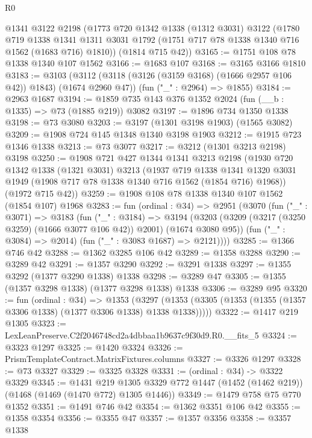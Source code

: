 \begin{lexlean}{R0}
\begin{coremodule}
    @1341
    @3122
    @2198
    (@1773
      @720
      @1342
      @1338
      (@1312 @3031)
      @3122
      (@1780
        @719
        @1338
        @1341
        @1311
        @3031
        @1792
        (@1751 @717 @78 @1338 @1340 @716 @1562 (@1683 @716) @1810))
      (@1814 @715 @42))
@3165 := @1751 @108 @78 @1338 @1340 @107 @1562
@3166 := @1683 @107
@3168 := @3165 @3166 @1810
@3183 := @3103
    (@3112 (@3118 (@3126 (@3159 @3168) (@1666 @2957 @106 @42)) @1843) (@1674 @2960 @47))
    (fun ("_" : @2964) => @1855)
@3184 := @2963 @1687
@3194 := @1859 @735 @143 @376 @1352 @2024 (fun (__b : @1335) => @73 (@1885 @219)) @3082
@3197 := @1896 @734 @1350 @1338
@3198 := @73 @3080
@3203 := @3197 (@1301 @3198 @1903) (@1565 @3082)
@3209 := @1908 @724 @145 @1348 @1340 @3198 @1903
@3212 := @1915 @723 @1346 @1338
@3213 := @73 @3077
@3217 := @3212 (@1301 @3213 @2198) @3198
@3250 := @1908
    @721
    @427
    @1344
    @1341
    @3213
    @2198
    (@1930
      @720
      @1342
      @1338
      (@1321 @3031)
      @3213
      (@1937
        @719
        @1338
        @1341
        @1320
        @3031
        @1949
        (@1908 @717 @78 @1338 @1340 @716 @1562 (@1854 @716) @1968))
      (@1972 @715 @42))
@3259 := @1908 @108 @78 @1338 @1340 @107 @1562 (@1854 @107) @1968
@3283 := fun (ordinal : @34) =>
  @2951
    (@3070
      (fun ("_" : @3071) =>
      @3183
        (fun ("_" : @3184) =>
        @3194
          (@3203 (@3209 (@3217 (@3250 @3259) (@1666 @3077 @106 @42)) @2001) (@1674 @3080 @95))
          (fun ("_" : @3084) => @2014)
          (fun ("_" : @3083 @1687) => @2121))))
@3285 := @1366 @746 @42
@3288 := @1362 @3285 @106 @42
@3289 := @1358 @3288
@3290 := @3289 @42
@3291 := @1357 @3290
@3292 := @3291 @1338
@3297 := @1355 @3292 (@1377 @3290 @1338) @1338
@3298 := @3289 @47
@3305 := @1355 (@1357 @3298 @1338) (@1377 @3298 @1338) @1338
@3306 := @3289 @95
@3320 := fun (ordinal : @34) =>
  @1353 (@3297 (@1353 (@3305 (@1353 (@1355 (@1357 @3306 @1338) (@1377 @3306 @1338) @1338 @1338)))))
@3322 := @1417 @219 @1305
@3323 := LexLeanPreserve.C2f2046748cd2a4dbbaa1b9637c9f30d9.R0.__fits_5
@3324 := @3323 @1297
@3325 := @1420 @3324
@3326 := PrismTemplateContract.MatrixFixtures.columns
@3327 := @3326 @1297
@3328 := @73 @3327
@3329 := @3325 @3328
@3331 := (ordinal : @34) -> @3322 @3329
@3345 := @1431
    @219
    @1305
    @3329
    @772
    @1447
    (@1452 (@1462 @219))
    (@1468 (@1469 (@1470 @772) @1305 @1446))
@3349 := @1479 @758 @75 @770 @1352
@3351 := @1491 @746 @42
@3354 := @1362 @3351 @106 @42
@3355 := @1358 @3354
@3356 := @3355 @47
@3357 := @1357 @3356
@3358 := @3357 @1338

\end{coremodule}
\end{lexlean}

